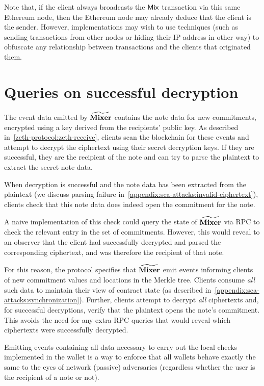 Note that, if the client always broadcasts the $\mathsf{Mix}$ transaction via this same Ethereum node, then the Ethereum node may already deduce that the client is the sender. However, implementations may wish to use techniques (such as sending transactions from other nodes or hiding their IP address in other way) to obfuscate any relationship between transactions and the clients that originated them.

\section{Queries on successful decryption}\label{appendix:sca-attacks:successful-decryption}

The event data emitted by $\widetilde{\mathbf{Mixer}}$ contains the note data for new commitments, encrypted using a key derived from the recipients' public key. As described in~\cref{zeth-protocol:zeth-receive}, clients scan the blockchain for these events and attempt to decrypt the ciphertext using their secret decryption keys. If they are successful, they are the recipient of the note and can try to parse the plaintext to extract the secret note data.

When decryption is successful and the note data has been extracted from the plaintext (we discuss parsing failure in~\cref{appendix:sca-attacks:invalid-ciphertext}), clients \MUST{} check that this note data does indeed open the commitment for the note.

A naive implementation of this check could query the state of $\widetilde{\mathbf{Mixer}}$ via RPC to check the relevant entry in the set of commitments. However, this would reveal to an observer that the client had successfully decrypted and parsed the corresponding ciphertext, and was therefore the recipient of that note.

For this reason, the protocol specifies that $\widetilde{\mathbf{Mixer}}$ \MUST{} emit events informing clients of new commitment values and locations in the Merkle tree. Clients \MUST{} consume \emph{all} such data to maintain their view of contract state (as described in~\cref{appendix:sca-attacks:synchronization}). Further, clients \MUST{} attempt to decrypt \emph{all} ciphertexts and, for successful decryptions, \MUST{} verify that the plaintext opens the note's commitment. This avoids the need for any extra RPC queries that would reveal which ciphertexts were successfully decrypted.

\begin{notebox}
    Emitting events containing all data necessary to carry out the local checks implemented in the wallet is a way to enforce that all wallets behave exactly the same to the eyes of network (passive) adversaries (regardless whether the user is the recipient of a note or not).
\end{notebox}

